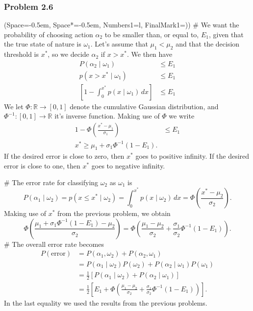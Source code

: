\documentclass[12pt, a4paper]{article}
\newcommand{\listSpace}{-0.5em}%
\newcommand{\R}{\mathbb{R}}
\begin{document}
\subsubsection*{Problem 2.6}
\begin{easylist}[enumerate]
\ListProperties(Space=\listSpace, Space*=\listSpace, Numbers1=l, FinalMark1={)})
# We want the probability of choosing action $\alpha_2$ to be smaller than, or equal to, $E_1$, given that the true state of nature is $\omega_1$.
Let's assume that $\mu_1 < \mu_2$ and that the decision threshold is $x^*$, so we decide $\alpha_2$ if $x > x^*$.
We then have
\begin{align*}
	P(\alpha_2  \mid  \omega_1) &\leq E_1 \\
	p(x > x^*  \mid  \omega_1) &\leq E_1 \\
	\left[1 - \int_{0}^{x^*} p(x  \mid  \omega_1)  \, dx \right] &\leq E_1
\end{align*}
We let $\Phi: \R \to \left[0, 1\right]$ denote the cumulative Gaussian distribution, and $\Phi^{-1}: \left[0, 1\right] \to \R$ it's inverse function.
Making use of $\Phi$ we write
\begin{align*}
1 - \Phi \left( \frac{x^* - \mu_1}{\sigma_1} \right) &\leq E_1 \\
x^* \geq \mu_1 + \sigma_1 \Phi^{-1} \left(1 - E_1 \right).
\end{align*}
If the desired error is close to zero, then $x^*$ goes to positive infinity.
If the desired error is close to one, then $x^*$ goes to negative infinity.

# The error rate for classifying $\omega_2$ as $\omega_1$ is
\begin{equation*}
	P(\alpha_1  \mid  \omega_2) = 	p(x \leq x^*  \mid  \omega_2) = \int_{0}^{x^*} p(x \mid  \omega_2) \, dx 
	= 
	\Phi \left(  \frac{x^* - \mu_2}{\sigma_2}  \right).
\end{equation*}
Making use of $x^*$ from the previous problem, we obtain
\begin{equation*}
 \Phi \left(  \frac{ \mu_1 + \sigma_1 \Phi^{-1} \left(1 - E_1 \right) - \mu_2}{\sigma_2}  \right) 
 =
\Phi \left(  \frac{\mu_1 - \mu_2}{\sigma_2} + \frac{\sigma_1}{\sigma_2}  \Phi^{-1} \left(1 - E_1 \right) \right).
\end{equation*}
# The overall error rate becomes
\begin{align*}
	P(\text{error}) &= P(\alpha_1, \omega_2) + P(\alpha_2, \omega_1) \\
	&= P(\alpha_1  \mid  \omega_2) P(\omega_2) + P(\alpha_2 \mid  \omega_1) P(\omega_1) \\
	&= \frac{1}{2} \left[  P(\alpha_1  \mid  \omega_2) +  P(\alpha_2 \mid  \omega_1) \right] \\
	&= \frac{1}{2} \left[ E_1 +  \Phi \left(  \frac{\mu_1 - \mu_2}{\sigma_2} + \frac{\sigma_1}{\sigma_2}  \Phi^{-1} \left(1 - E_1 \right) \right) \right].
\end{align*}
In the last equality we used the results from the previous problems.


\end{easylist}
\end{document}
